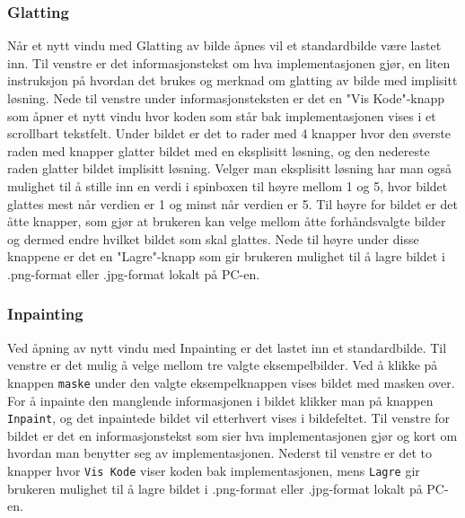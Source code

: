 \newpage

\subsubsection{Glatting}
Når et nytt vindu med Glatting av bilde åpnes vil et standardbilde være lastet inn. Til venstre er det informasjonstekst om hva implementasjonen gjør, en liten instruksjon på hvordan det brukes og merknad om glatting av bilde med implisitt løsning. Nede til venstre under informasjonsteksten er det en "Vis Kode"-knapp som åpner et nytt vindu hvor koden som står bak implementasjonen vises i et scrollbart tekstfelt. Under bildet er det to rader med 4 knapper hvor den øverste raden med knapper glatter bildet med en eksplisitt løsning, og den nedereste raden glatter bildet implisitt løsning. Velger man eksplisitt løsning har man også mulighet til å stille inn en verdi i spinboxen til høyre mellom 1 og 5, hvor bildet glattes mest når verdien er 1 og minst når verdien er 5. Til høyre for bildet er det åtte knapper, som gjør at brukeren kan velge mellom åtte forhåndsvalgte bilder og dermed endre hvilket bildet som skal glattes. Nede til høyre under disse knappene er det en "Lagre"-knapp som gir brukeren mulighet til å lagre bildet i .png-format eller .jpg-format lokalt på PC-en. 

\subsubsection{Inpainting}
Ved åpning av nytt vindu med Inpainting er det lastet inn et standardbilde. Til venstre er det mulig å velge mellom tre valgte eksempelbilder. Ved å klikke på knappen \texttt{maske} under den valgte eksempelknappen vises bildet med masken over. For å inpainte den manglende informasjonen i bildet klikker man på knappen \texttt{Inpaint}, og det inpaintede bildet vil etterhvert vises i bildefeltet. Til venstre for bildet er det en informasjonstekst som sier hva implementasjonen gjør og kort om hvordan man benytter seg av implementasjonen. Nederst til venstre er det to knapper hvor \texttt{Vis Kode} viser koden bak implementasjonen, mens \texttt{Lagre} gir brukeren mulighet til å lagre bildet i .png-format eller .jpg-format lokalt på PC-en.

